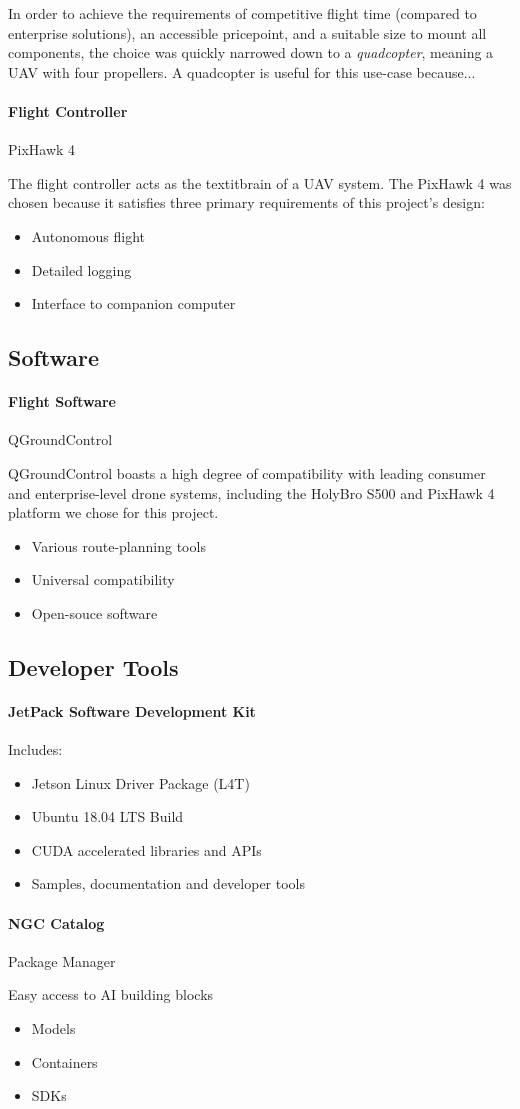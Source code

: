 In order to achieve the requirements of competitive flight time (compared to enterprise solutions), an accessible pricepoint, and a suitable size to mount all components, the choice was quickly narrowed down to a \textit{quadcopter}, meaning a UAV with four propellers. A quadcopter is useful for this use-case because...

\paragraph{Flight Controller} PixHawk 4

The flight controller acts as the textit{brain} of a UAV system. The PixHawk 4 was chosen because it satisfies three primary requirements of this project's design:
\begin{itemize}
\item {Autonomous flight}
\item {Detailed logging}
\item {Interface to companion computer}
\end{itemize}

\subsection{Software}
\paragraph{Flight Software} QGroundControl

QGroundControl boasts a high degree of compatibility with leading consumer and enterprise-level drone systems, including the HolyBro S500 and PixHawk 4 platform we chose for this project.
\begin{itemize}
    \item {Various route-planning tools}
    \item {Universal compatibility}
    \item {Open-souce software}
\end{itemize}

\subsection{Developer Tools}
\paragraph{JetPack Software Development Kit}

Includes:
\begin{itemize}
    \item {Jetson Linux Driver Package (L4T)}
    \item {Ubuntu 18.04 LTS Build}
    \item {CUDA accelerated libraries and APIs}
    \item {Samples, documentation and developer tools}
\end{itemize}

\paragraph{NGC Catalog} Package Manager

Easy access to AI building blocks
\begin{itemize}
    \item {Models}
    \item {Containers}
    \item {SDKs}
\end{itemize}
